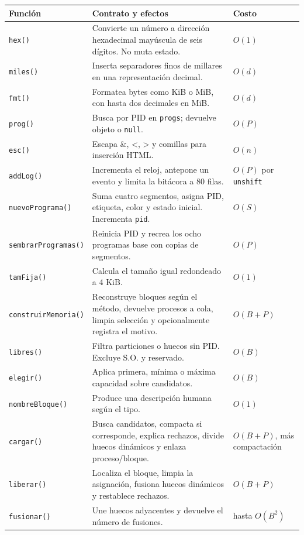 \documentclass[11pt,a4paper]{article}
\newcommand{\funcion}[1]{\texttt{#1()}}
\begin{document}
\begin{longtable}{p{}p{}p{}}
\toprule
\textbf{Función} & \textbf{Contrato y efectos} & \textbf{Costo}\\
\midrule
\endhead
\funcion{hex} & Convierte un número a dirección hexadecimal mayúscula de seis dígitos. No muta estado. & \(O(1)\)\\
\funcion{miles} & Inserta separadores finos de millares en una representación decimal. & \(O(d)\)\\
\funcion{fmt} & Formatea bytes como KiB o MiB, con hasta dos decimales en MiB. & \(O(d)\)\\
\funcion{prog} & Busca por PID en \texttt{progs}; devuelve objeto o \texttt{null}. & \(O(P)\)\\
\funcion{esc} & Escapa \&, \textless, \textgreater{} y comillas para inserción HTML. & \(O(n)\)\\
\funcion{addLog} & Incrementa el reloj, antepone un evento y limita la bitácora a 80 filas. & \(O(P)\) por \texttt{unshift}\\
\funcion{nuevoPrograma} & Suma cuatro segmentos, asigna PID, etiqueta, color y estado inicial. Incrementa \texttt{pid}. & \(O(S)\)\\
\funcion{sembrarProgramas} & Reinicia PID y recrea los ocho programas base con copias de segmentos. & \(O(P)\)\\
\funcion{tamFija} & Calcula el tamaño igual redondeado a 4 KiB. & \(O(1)\)\\
\funcion{construirMemoria} & Reconstruye bloques según el método, devuelve procesos a cola, limpia selección y opcionalmente registra el motivo. & \(O(B+P)\)\\
\funcion{libres} & Filtra particiones o huecos sin PID. Excluye S.O. y reservado. & \(O(B)\)\\
\funcion{elegir} & Aplica primera, mínima o máxima capacidad sobre candidatos. & \(O(B)\)\\
\funcion{nombreBloque} & Produce una descripción humana según el tipo. & \(O(1)\)\\
\funcion{cargar} & Busca candidatos, compacta si corresponde, explica rechazos, divide huecos dinámicos y enlaza proceso/bloque. & \(O(B+P)\), más compactación\\
\funcion{liberar} & Localiza el bloque, limpia la asignación, fusiona huecos dinámicos y restablece rechazos. & \(O(B+P)\)\\
\funcion{fusionar} & Une huecos adyacentes y devuelve el número de fusiones. & hasta \(O(B^2)\)\\

\end{longtable}
\end{document}
